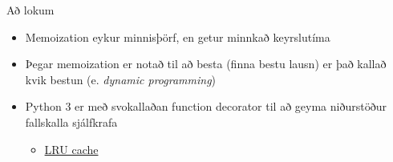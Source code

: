 \documentclass[handout]{beamer}
\begin{document}
\begin{frame}{Að lokum}
\begin{itemize}
 \item Memoization eykur minnisþörf, en getur minnkað keyrslutíma
 \item Þegar memoization er notað til að besta (finna bestu lausn) er það kallað kvik bestun (e. \emph{dynamic programming})
 \item Python 3 er með svokallaðan function decorator til að geyma niðurstöður fallskalla sjálfkrafa
 \begin{itemize}
  \item \href{https://docs.python.org/3/library/functools.html\#functools.lru\_cache}{LRU cache}
 \end{itemize}
\end{itemize}
\end{frame}
\end{document}
